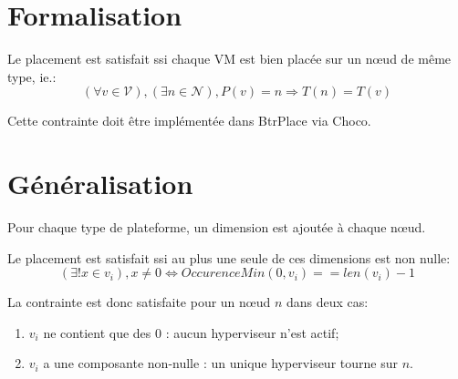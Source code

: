\documentclass[a4paper]{article}
\begin{document}

\section{Formalisation}
Le placement est satisfait ssi chaque VM est bien placée sur
un nœud de même type, ie.:
\[
	(\forall v \in \mathcal V), (\exists n \in \mathcal N), P(v) = n
		\Rightarrow T(n) = T(v)	
\]

Cette contrainte doit être implémentée dans BtrPlace via Choco.

\section{Généralisation}
Pour chaque type de plateforme, un dimension est ajoutée à chaque
nœud.


Le placement est satisfait ssi au plus une seule de ces dimensions est
non nulle:
\[
	(\exists ! x \in v_i), x \neq 0
	\Leftrightarrow OccurenceMin(0, v_i) == len(v_i)-1
\]


La contrainte est donc satisfaite pour un nœud $n$ dans deux cas:
\begin{enumerate}
	\item $v_i$ ne contient que des $0$ : aucun hyperviseur n'est actif;
	\item $v_i$ a une composante non-nulle : un unique hyperviseur tourne sur $n$.
\end{enumerate}

\newpage
{}


\end{document}
